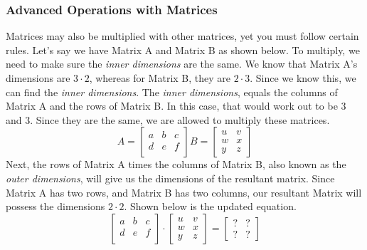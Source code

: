 \documentclass[final,1p,12pt]{elsarticle}
\begin{document}
        \subsubsection{Advanced Operations with Matrices}
        Matrices may also be multiplied with other matrices, yet you must follow certain rules. Let's say we have Matrix A and Matrix B as shown below. To multiply, we need to make sure the \emph{inner dimensions} are the same. We know that Matrix A's dimensions are $3 \cdot 2$, whereas for Matrix B, they are $2 \cdot 3$. Since we know this, we can find the \emph{inner dimensions}. The \emph{inner dimensions}, equals the columns of Matrix A and the rows of Matrix B. In this case, that would work out to be $3$ and $3$. Since they are the same, we are allowed to multiply these matrices. 
        \begin{equation}%
            A =
            \begin{bmatrix}
                a & b & c\\
                d & e & f\\
            \end{bmatrix}
            B = 
            \begin{bmatrix}
                u & v\\
                w & x\\
                y & z
            \end{bmatrix}
        \end{equation}
        Next, the rows of Matrix A times the columns of Matrix B, also known as the \emph{outer dimensions}, will give us the dimensions of the resultant matrix. Since Matrix A has two rows, and Matrix B has two columns, our resultant Matrix will possess the dimensions $2\cdot2$. Shown below is the updated equation. 
        \begin{equation}
            \begin{bmatrix}
                a & b & c\\
                d & e & f\\
            \end{bmatrix}
        \cdot
            \begin{bmatrix}
                u & v\\
                w & x\\
                y & z
            \end{bmatrix}
        =
            \begin{bmatrix}
                ?&?\\
                ?&?
            \end{bmatrix}
        \end{equation}
\end{document}
